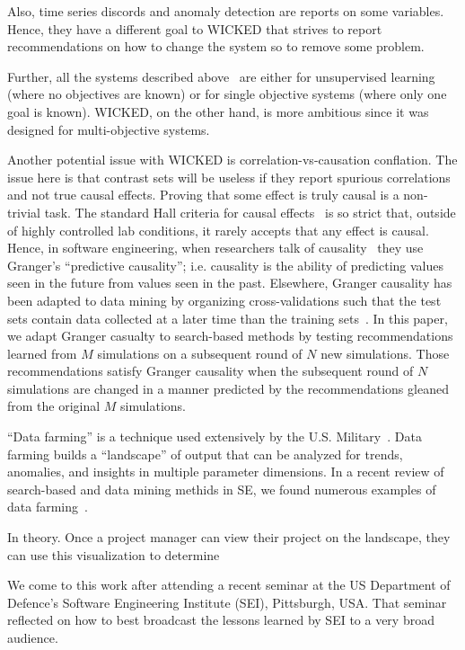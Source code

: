 \documentclass[runningheads]{llncs}
\begin{document}
Also, time series discords and anomaly detection are reports
on some variables. Hence, they have a different goal to WICKED that
strives to report recommendations on how to change the system
so to remove some problem. 

Further, all the systems described
above~\cite{voinea07,horvitz05,keogh05,gruska10} are
either for unsupervised learning (where no
objectives are known) or for single objective
systems (where only one goal is known). WICKED, on the
other hand, is more ambitious since it was designed
for multi-objective systems.

Another potential issue with WICKED is
correlation-vs-causation conflation. The issue here
is that contrast sets will be useless if they
report spurious correlations and not true causal
effects.  Proving that some effect is truly causal
is a non-trivial task.  The standard Hall criteria
for causal effects~\cite{paul13} is so strict that,
outside of highly controlled lab conditions, it
rarely accepts that any effect is causal.  Hence, in
software engineering, when researchers talk of
causality~\cite{couto14,zheng14z,huber09,bhat!icse12}
they use Granger's ``predictive causality'';
i.e. causality is the ability of predicting
values seen in the future from values seen in the
past.  Elsewhere, Granger causality has been adapted
to data mining by organizing cross-validations such
that the test sets contain data collected at a later
time than the training sets~\cite{me11f}.  In this
paper, we adapt Granger casualty to search-based
methods by testing recommendations learned from $M$
simulations on a subsequent round of $N$ new
simulations.  Those recommendations satisfy Granger
causality when the subsequent round of $N$
simulations are changed in a manner predicted by the
recommendations gleaned from the original $M$
simulations.


``Data farming'' is a technique used extensively by the
U.S. Military~\cite{meyer04}.
Data farming builds a ``landscape''
of output that can be analyzed for trends, anomalies, and insights in
multiple parameter dimensions.  
In  a recent review of search-based and data mining methids in SE,
we found numerous examples
of data farming~\cite{strickland03,Myrtveit,Shepperd01,pearce99,vanlamsweerde98integrating,chung00,me03j,heaven11,rodriguez11,jian09}.

In theory. Once a project manager can view their project on the landscape,
they can use this visualization to determine

We come to this work after attending a recent seminar at the US 
Department of Defence's Software Engineering Institute (SEI), Pittsburgh, USA.
That seminar reflected on how to best broadcast the lessons learned by SEI
to a very broad audience.
\end{document}
